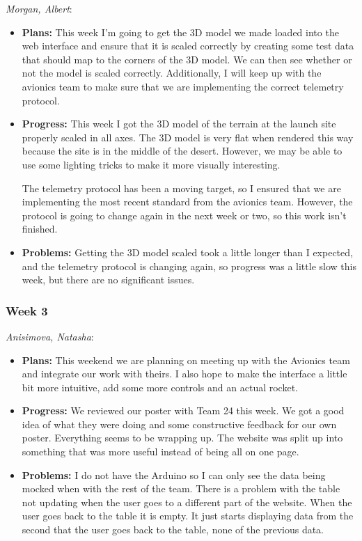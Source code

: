 \documentclass[10pt,draftclsnofoot,onecolumn]{IEEEtran}
\newcommand{\subsubsubsection}[1]{
	\hfill\break\textit{#1}:
}
\begin{document}
\subsubsubsection{Morgan, Albert}
\begin{itemize}
	\item \textbf{Plans: }
	This week I'm going to get the 3D model we made loaded into the web interface and ensure that it is scaled correctly by creating some test data that should map to the corners of the 3D model. We can then see whether or not the model is scaled correctly. Additionally, I will keep up with the avionics team to make sure that we are implementing the correct telemetry protocol.
	\item \textbf{Progress: }
	This week I got the 3D model of the terrain at the launch site properly scaled in all axes. The 3D model is very flat when rendered this way because the site is in the middle of the desert. However, we may be able to use some lighting tricks to make it more visually interesting.

	The telemetry protocol has been a moving target, so I ensured that we are implementing the most recent standard from the avionics team. However, the protocol is going to change again in the next week or two, so this work isn't finished.
	\item \textbf{Problems: }
	Getting the 3D model scaled took a little longer than I expected, and the telemetry protocol is changing again, so progress was a little slow this week, but there are no significant issues.
\end{itemize}

\subsubsection{Week 3}
\subsubsubsection{Anisimova, Natasha}
\begin{itemize}
	\item \textbf{Plans: }
	This weekend we are planning on meeting up with the Avionics team and integrate our work with theirs. I also hope to make the interface a little bit more intuitive, add some more controls and an actual rocket.
	\item \textbf{Progress:  }
	We reviewed our poster with Team 24 this week. We got a good idea of what they were doing and some constructive feedback for our own poster. Everything seems to be wrapping up. The website was split up into something that was more useful instead of being all on one page.
	\item \textbf{Problems: }
	I do not have the Arduino so I can only see the data being mocked when with the rest of the team. There is a problem with the table not updating when the user goes to a different part of the website. When the user goes back to the table it is empty. It just starts displaying data from the second that the user goes back to the table, none of the previous data.
\end{itemize}
\end{document}
